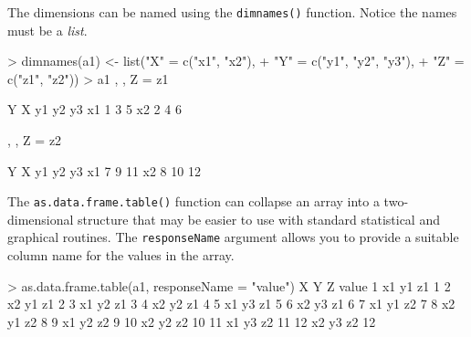 \documentclass[
]{book}
\newenvironment{Shaded}{\begin{snugshade}}{\end{snugshade}}
\newcommand{\AttributeTok}[1]{\textcolor[rgb]{0.77,0.63,0.00}{#1}}
\newcommand{\DecValTok}[1]{\textcolor[rgb]{0.00,0.00,0.81}{#1}}
\newcommand{\FunctionTok}[1]{\textcolor[rgb]{0.00,0.00,0.00}{#1}}
\newcommand{\NormalTok}[1]{#1}
\newcommand{\OtherTok}[1]{\textcolor[rgb]{0.56,0.35,0.01}{#1}}
\newcommand{\SpecialCharTok}[1]{\textcolor[rgb]{0.00,0.00,0.00}{#1}}
\newcommand{\StringTok}[1]{\textcolor[rgb]{0.31,0.60,0.02}{#1}}
\begin{document}
The dimensions can be named using the \texttt{dimnames()} function. Notice the names must be a \emph{list}.

\begin{Shaded}
\begin{Highlighting}[]
\SpecialCharTok{\textgreater{}} \FunctionTok{dimnames}\NormalTok{(a1) }\OtherTok{\textless{}{-}} \FunctionTok{list}\NormalTok{(}\StringTok{"X"} \OtherTok{=} \FunctionTok{c}\NormalTok{(}\StringTok{"x1"}\NormalTok{, }\StringTok{"x2"}\NormalTok{), }
\SpecialCharTok{+}                      \StringTok{"Y"} \OtherTok{=} \FunctionTok{c}\NormalTok{(}\StringTok{"y1"}\NormalTok{, }\StringTok{"y2"}\NormalTok{, }\StringTok{"y3"}\NormalTok{), }
\SpecialCharTok{+}                      \StringTok{"Z"} \OtherTok{=} \FunctionTok{c}\NormalTok{(}\StringTok{"z1"}\NormalTok{, }\StringTok{"z2"}\NormalTok{))}
\SpecialCharTok{\textgreater{}}\NormalTok{ a1}
\NormalTok{, , Z }\OtherTok{=}\NormalTok{ z1}

\NormalTok{    Y}
\NormalTok{X    y1 y2 y3}
\NormalTok{  x1  }\DecValTok{1}  \DecValTok{3}  \DecValTok{5}
\NormalTok{  x2  }\DecValTok{2}  \DecValTok{4}  \DecValTok{6}

\NormalTok{, , Z }\OtherTok{=}\NormalTok{ z2}

\NormalTok{    Y}
\NormalTok{X    y1 y2 y3}
\NormalTok{  x1  }\DecValTok{7}  \DecValTok{9} \DecValTok{11}
\NormalTok{  x2  }\DecValTok{8} \DecValTok{10} \DecValTok{12}
\end{Highlighting}
\end{Shaded}

The \texttt{as.data.frame.table()} function can collapse an array into a two-dimensional structure that may be easier to use with standard statistical and graphical routines. The \texttt{responseName} argument allows you to provide a suitable column name for the values in the array.

\begin{Shaded}
\begin{Highlighting}[]
\SpecialCharTok{\textgreater{}} \FunctionTok{as.data.frame.table}\NormalTok{(a1, }\AttributeTok{responseName =} \StringTok{"value"}\NormalTok{)}
\NormalTok{    X  Y  Z value}
\DecValTok{1}\NormalTok{  x1 y1 z1     }\DecValTok{1}
\DecValTok{2}\NormalTok{  x2 y1 z1     }\DecValTok{2}
\DecValTok{3}\NormalTok{  x1 y2 z1     }\DecValTok{3}
\DecValTok{4}\NormalTok{  x2 y2 z1     }\DecValTok{4}
\DecValTok{5}\NormalTok{  x1 y3 z1     }\DecValTok{5}
\DecValTok{6}\NormalTok{  x2 y3 z1     }\DecValTok{6}
\DecValTok{7}\NormalTok{  x1 y1 z2     }\DecValTok{7}
\DecValTok{8}\NormalTok{  x2 y1 z2     }\DecValTok{8}
\DecValTok{9}\NormalTok{  x1 y2 z2     }\DecValTok{9}
\DecValTok{10}\NormalTok{ x2 y2 z2    }\DecValTok{10}
\DecValTok{11}\NormalTok{ x1 y3 z2    }\DecValTok{11}
\DecValTok{12}\NormalTok{ x2 y3 z2    }\DecValTok{12}
\end{Highlighting}
\end{Shaded}
\end{document}

